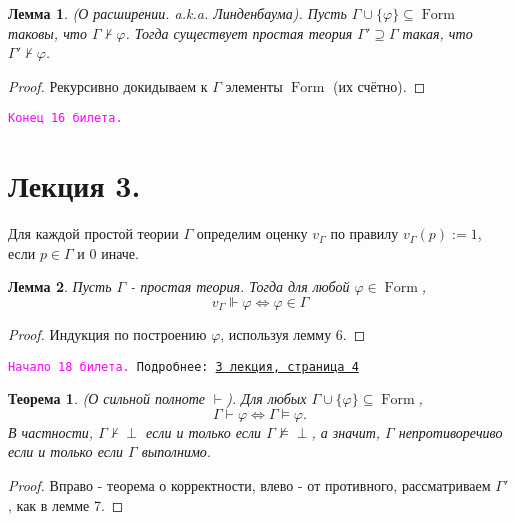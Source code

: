 \documentclass[a4paper,100pt]{article}
\theoremstyle{indented}
\newtheorem{theorem}{Теорема}
\newtheorem{lemma}{Лемма}
\theoremstyle{definition}
\theoremstyle{remark}
\DeclareMathOperator{\Llra}{\Longleftrightarrow}
\DeclareMathOperator{\form}{Form}
\begin{document}
\begin{lemma}
  (О расширении. a.k.a. Линденбаума). Пусть $\Gamma \cup \{\varphi \}\subseteq \form$ таковы, что $\Gamma \nvdash \varphi$. Тогда существует простая теория $\Gamma'\supseteq \Gamma$ такая, что $\Gamma' \nvdash \varphi$.
\end{lemma}

\begin{proof}
  Рекурсивно докидываем к $\Gamma$ элементы $\form$ (их счётно).
\end{proof}

\texttt{\textcolor{magenta}{Конец 16 билета.}} 

\hrulefill

\section{Лекция 3.}

Для каждой простой теории $\Gamma$ определим оценку $v_\Gamma$ по правилу $v_\Gamma(p):=1$, если $p\in \Gamma$ и 0 иначе. \\

\begin{lemma}
  Пусть $\Gamma$ - простая теория. Тогда для любой $\varphi \in \form$, 
  \[
    v_\Gamma \Vdash \varphi \Longleftrightarrow \varphi \in \Gamma
  \]
\end{lemma}

\begin{proof}
  Индукция по построению $\varphi$, используя лемму 6.
\end{proof}

\hrulefill

\texttt{\hypertarget{b18}{\textcolor{magenta}{Начало 18 билета.}} Подробнее: \href{http://www.mi-ras.ru/~speranski/courses/logic-1-2021-spring/slides_3.pdf}{3 лекция, страница 4}} \\

\begin{theorem}
  (О сильной полноте $\vdash$). Для любых $\Gamma\cup \{\varphi\}\subseteq \form$, 
  \[
    \Gamma \vdash \varphi \Llra \Gamma \vDash \varphi. 
  \]
  В частности, $\Gamma \nvdash \perp$ если и только если $\Gamma \nvDash \perp$, а значит, $\Gamma$ непротиворечиво если и только если $\Gamma$ выполнимо.
\end{theorem}

\begin{proof}
  Вправо - теорема о корректности, влево - от противного, рассматриваем $\Gamma'$, как в лемме 7.
\end{proof}
\end{document}
